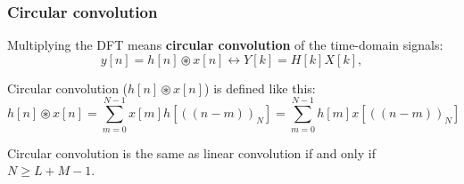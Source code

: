 \documentclass{beamer}
\begin{document}
\begin{frame}
  \frametitle{Circular convolution}

  Multiplying the DFT means {\bf circular convolution} of the time-domain signals:
  \begin{displaymath}
    y[n]=h[n]\circledast x[n] \leftrightarrow Y[k] = H[k]X[k],
  \end{displaymath}
  
  Circular convolution ($h[n]\circledast x[n]$) is defined like this:
  \begin{displaymath}
    h[n]\circledast x[n] = \sum_{m=0}^{N-1}x[m]h\left[(\!(n-m)\!)_N\right]
    = \sum_{m=0}^{N-1}h[m]x\left[(\!(n-m)\!)_N\right]
  \end{displaymath}

  Circular convolution is the same as linear convolution if and only if $N\ge L+M-1$.
\end{frame}
\end{document}
